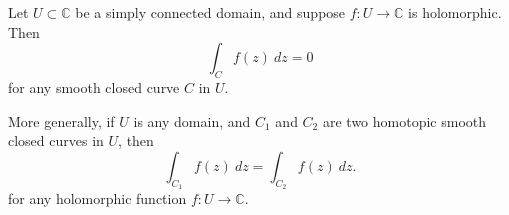 \documentclass{article}
\begin{document}
Let $U \subset \mathbb{C}$ be a simply connected domain, and suppose $f: U \longrightarrow \mathbb{C}$ is holomorphic. Then
$$
\int_C f(z)\ dz = 0
$$
for any smooth closed curve $C$ in $U$.

More generally, if $U$ is any domain, and $C_1$ and $C_2$ are two homotopic smooth closed curves in $U$, then
$$
\int_{C_1} f(z)\ dz = \int_{C_2} f(z)\ dz.
$$
for any holomorphic function $f: U \longrightarrow \mathbb{C}$.
\end{document}
